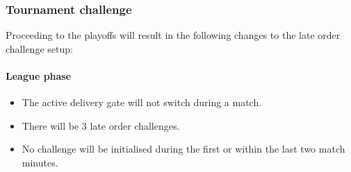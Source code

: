\documentclass[12pt,twoside]{article}
\begin{document}
\subsubsection{Tournament challenge}
Proceeding to the playoffs will result in the following changes to the
late order challenge setup:

\paragraph{League phase}
\begin{itemize}
\item The active delivery gate will not switch during a match.
\item There will be 3 late order challenges.
\item No challenge will be initialised during the first or within the
  last two match minutes.
\end{itemize} 
\end{document}
